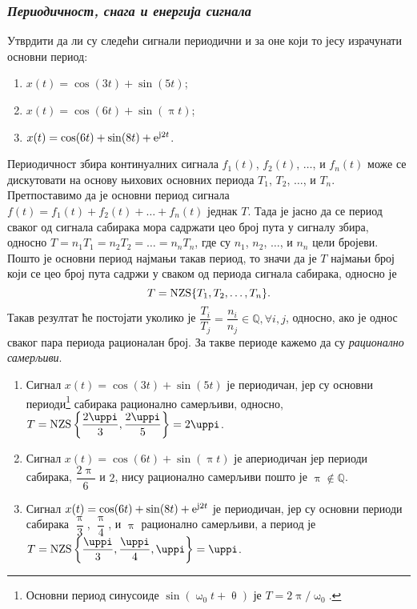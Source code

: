 \subsubsection{\textit{Периодичност, снага и енергија сигнала}}
\PID 
\noindent 
Утврдити да ли су следећи сигнали периодични и за оне који то јесу израчунати 
основни период:
\begin{multicols}{2}
\begin{enumerate}[label=(\alph*)]
\item $x(t) = \cos(3t) + \sin(5t)$;
\item $x(t) = \cos(6t) + \sin(\uppi t)$;
\item $x(t) = \cos(6t) + \sin(8t) + {\rm e}^{{\rm j}2t}$.
\end{enumerate}
\end{multicols}

\RESENJE 
Периодичност збира континуалних сигнала $f_1(t)$, $f_2(t)$, $\ldots$, и $f_n(t)$ може се дискутовати на основу њихових основних 
периода $T_1$, $T_2$, $\ldots$, и $T_n$. Претпоставимо да је основни период сигнала 
$f(t) = f_1(t) + f_2(t) + \ldots + f_n(t)$ једнак $T$. Тада је јасно да се период сваког од сигнала сабирака 
мора садржати цео број пута у сигналу збира, односно $T = n_1T_1 = n_2T_2 = \ldots = n_nT_n$, где су $n_1$, $n_2$, $\ldots$, и $n_n$ 
цели бројеви. Пошто је основни период најмањи такав период, то значи да је $T$ најмањи број који се цео број пута 
садржи у сваком од периода сигнала сабирака, односно је
\begin{equation}
    T = {\rm NZS} \{ T_1, T_2, \ldots, T_n\}.
    \label{eq:nzs}
\end{equation}
Такав резултат ће постојати уколико је $\dfrac{T_i}{T_j} = \dfrac{n_i}{n_j} \in \mathbb Q, \forall i,j$,
односно, ако је однос сваког пара периода рационалан број.    
За такве периоде кажемо да су \textit{рационално самерљиви}.

\begin{enumerate}[label=(\alph*)]
    \item Сигнал $x(t) = \cos(3t) + \sin(5t)$ је периодичан, јер су основни периоди\footnote{
    Основни период синусоиде $\sin(\upomega_0 t + \uptheta)$ је $T = 2\uppi /\upomega_0$.
    } сабирака рационално самерљиви, односно,  
    $T = {\rm NZS} \left\{ \dfrac{2\uppi}{3}, \dfrac{2\uppi}{5} \right\} = 2\uppi$. 
    \item Сигнал $x(t) = \cos(6t) + \sin(\uppi t)$ је 
    апериодичан јер периоди сабирака, $\dfrac{2\uppi}{6}$ и $2$, нису рационално самерљиви пошто је 
    $\uppi \not\in \mathbb Q$.
    \item Сигнал $x(t) = \cos(6t) + \sin(8t) + {\rm e}^{{\rm j}2t}$ је периодичан, 
    јер су основни периоди сабирака
    $\dfrac{\uppi}{3}$, $\dfrac{\uppi}{4}$, и $\uppi$ рационално самерљиви, а период
    је $T = {\rm NZS} \left\{ \dfrac{\uppi}{3}, \dfrac{\uppi}{4}, \uppi \right\} = \uppi$.
\end{enumerate}
